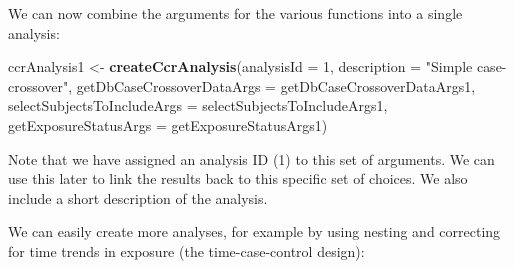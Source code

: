 \documentclass[]{article}
\newenvironment{Shaded}{\begin{snugshade}}{\end{snugshade}}
\newcommand{\DataTypeTok}[1]{\textcolor[rgb]{0.13,0.29,0.53}{#1}}
\newcommand{\DecValTok}[1]{\textcolor[rgb]{0.00,0.00,0.81}{#1}}
\newcommand{\KeywordTok}[1]{\textcolor[rgb]{0.13,0.29,0.53}{\textbf{#1}}}
\newcommand{\NormalTok}[1]{#1}
\newcommand{\StringTok}[1]{\textcolor[rgb]{0.31,0.60,0.02}{#1}}
\begin{document}
We can now combine the arguments for the various functions into a single
analysis:

\begin{Shaded}
\begin{Highlighting}[]
\NormalTok{ccrAnalysis1 <-}\StringTok{ }\KeywordTok{createCcrAnalysis}\NormalTok{(}\DataTypeTok{analysisId =} \DecValTok{1}\NormalTok{,}
                                 \DataTypeTok{description =} \StringTok{"Simple case-crossover"}\NormalTok{,}
                                 \DataTypeTok{getDbCaseCrossoverDataArgs =}\NormalTok{ getDbCaseCrossoverDataArgs1,}
                                 \DataTypeTok{selectSubjectsToIncludeArgs =}\NormalTok{ selectSubjectsToIncludeArgs1,}
                                 \DataTypeTok{getExposureStatusArgs =}\NormalTok{ getExposureStatusArgs1)}
\end{Highlighting}
\end{Shaded}

Note that we have assigned an analysis ID (1) to this set of arguments.
We can use this later to link the results back to this specific set of
choices. We also include a short description of the analysis.

We can easily create more analyses, for example by using nesting and
correcting for time trends in exposure (the time-case-control design):
\end{document}
